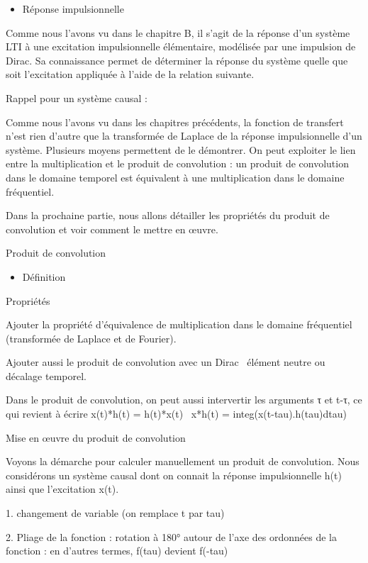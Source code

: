 \documentclass[]{article}
\begin{document}
\begin{itemize}
\itemsep1pt\parskip0pt
\item
  Réponse impulsionnelle
\end{itemize}

Comme nous l'avons vu dans le chapitre B, il s'agit de la réponse d'un
système LTI à une excitation impulsionnelle élémentaire, modélisée par
une impulsion de Dirac. Sa connaissance permet de déterminer la réponse
du système quelle que soit l'excitation appliquée à l'aide de la
relation suivante.

Rappel pour un système causal :~

Comme nous l'avons vu dans les chapitres précédents, la fonction de
transfert n'est rien d'autre que la transformée de Laplace de la réponse
impulsionnelle d'un système. Plusieurs moyens permettent de le
démontrer. On peut exploiter le lien entre la multiplication et le
produit de convolution : un produit de convolution dans le domaine
temporel est équivalent à une multiplication dans le domaine
fréquentiel.

Dans la prochaine partie, nous allons détailler les propriétés du
produit de convolution et voir comment le mettre en œuvre.

Produit de convolution

\begin{itemize}
\itemsep1pt\parskip0pt
\item
  Définition
\end{itemize}

Propriétés

Ajouter la propriété d'équivalence de multiplication dans le domaine
fréquentiel (transformée de Laplace et de Fourier).

Ajouter aussi le produit de convolution avec un Dirac~ élément neutre ou
décalage temporel.

Dans le produit de convolution, on peut aussi intervertir les arguments
τ et t-τ, ce qui revient à écrire x(t)*h(t) = h(t)*x(t)~ x*h(t) =
integ(x(t-tau).h(tau)dtau)

Mise en œuvre du produit de convolution

Voyons la démarche pour calculer manuellement un produit de convolution.
Nous considérons un système causal dont on connait la réponse
impulsionnelle h(t) ainsi que l'excitation x(t).

1. changement de variable (on remplace t par tau)

2. Pliage de la fonction : rotation à 180° autour de l'axe des ordonnées
de la fonction : en d'autres termes, f(tau) devient f(-tau)
\end{document}
